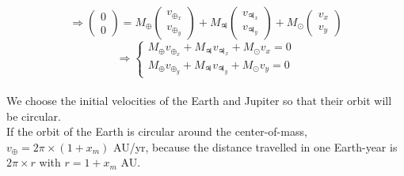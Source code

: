 \documentclass[a4paper, twoside, 11pt]{report}
\theoremstyle{theorem}
\theoremstyle{remark}
\theoremstyle{exemple}
\begin{document}
                \begin{equation*}
                    \Longrightarrow \left(\begin{array}{c}
                            0\\
                            0
                    \end{array} \right) = M_{\oplus} 
                        \left(\begin{array}{c}
                                v_{\oplus_x}\\
                                v_{\oplus_y}
                        \end{array} \right) + M_{\jupiter}
                             \left(\begin{array}{c}
                                    v_{\jupiter_x}\\
                                    v_{\jupiter_y}
                            \end{array} \right) + M_{\odot}
                                \left(\begin{array}{c}
                                        v_x\\
                                        v_y    
                                \end{array} \right)
                \end{equation*}
                \begin{equation*}
                   \Longrightarrow \left\{
                        \begin{aligned}
                            M_{\oplus} v_{\oplus_x} + M_{\jupiter} v_{\jupiter_x} + M_{\odot} v_x = 0 \\
                            M_{\oplus} v_{\oplus_y} + M_{\jupiter} v_{\jupiter_y} + M_{\odot} v_y = 0
                        \end{aligned}
                    \right.
                \end{equation*}
            
            \paragraph{}We choose the initial velocities of the Earth and Jupiter so that their orbit will be circular.\\
            If the orbit of the Earth is circular around the center-of-mass, $v_{\oplus} = 2 \pi \times (1+x_m)$ AU/yr, because the distance travelled in one Earth-year is $2 \pi \times r$ with $r = 1 + x_m$ AU.
            
\end{document}

